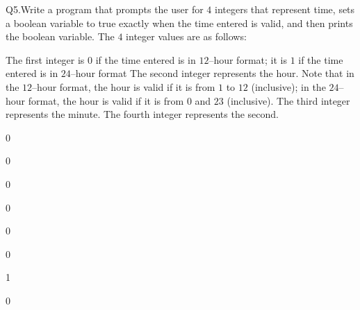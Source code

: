 Q5.Write a program that prompts the user for $4$ integers that represent time,
sets a boolean variable to true exactly when the time entered is valid, and
then prints the boolean variable. The $4$ integer values are as follows:
\begin{itemize}
  \li The first integer is $0$ if the time entered is in $12$--hour format; it
      is $1$ if the time entered is in $24$--hour format
  \li The second integer represents the hour. Note that in the $12$--hour
      format, the hour is valid if it is 
      from $1$ to  $12$ (inclusive); 
      in the
      $24$--hour format, the hour is valid if it is 
      from $0$ and $23$ (inclusive).
  \li The third integer represents the minute. 
  \li The fourth integer represents the second.
\end{itemize}

\resett
\nextt
\begin{console}[commandchars=\\\{\}]
0
\end{console}

\nextt
\begin{console}[commandchars=\\\{\}]
0
\end{console}

\nextt
\begin{console}[commandchars=\\\{\}]
0
\end{console}

\nextt
\begin{console}[commandchars=\\\{\}]
0
\end{console}

\nextt
\begin{console}[commandchars=\\\{\}]
0
\end{console}

\nextt
\begin{console}[commandchars=\\\{\}]
0
\end{console}

\nextt
\begin{console}[commandchars=\\\{\}]
1
\end{console}

\nextt
\begin{console}[commandchars=\\\{\}]
0
\end{console}

